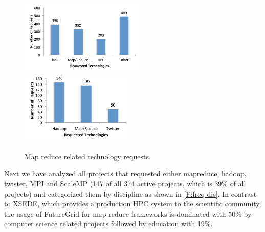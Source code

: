 \documentclass[graybox]{svmult}
\begin{document}
\begin{figure}[htb]
 \centering
   \includegraphics[height=3.5cm]{images/tech-trend-1.pdf}\includegraphics[height=3.5cm]{images/tech-trend-2.pdf}
 \caption{Map reduce related technology requests.}
\label{F:reduce-breakdown}
\end{figure}




Next we have analyzed all projects that requested either mapreduce, hadoop, twister, MPI and ScaleMP (147 of all 374 active projects, which is 39\% of all projects) and categorized them by discipline as shown in \ref{F:freq-dis}. In contrast to XSEDE, which provides a production HPC system to the scientific community, the usage of FutureGrid for map reduce frameworks is dominated with 50\% by computer science related projects followed by education with 19\%.
\end{document}

